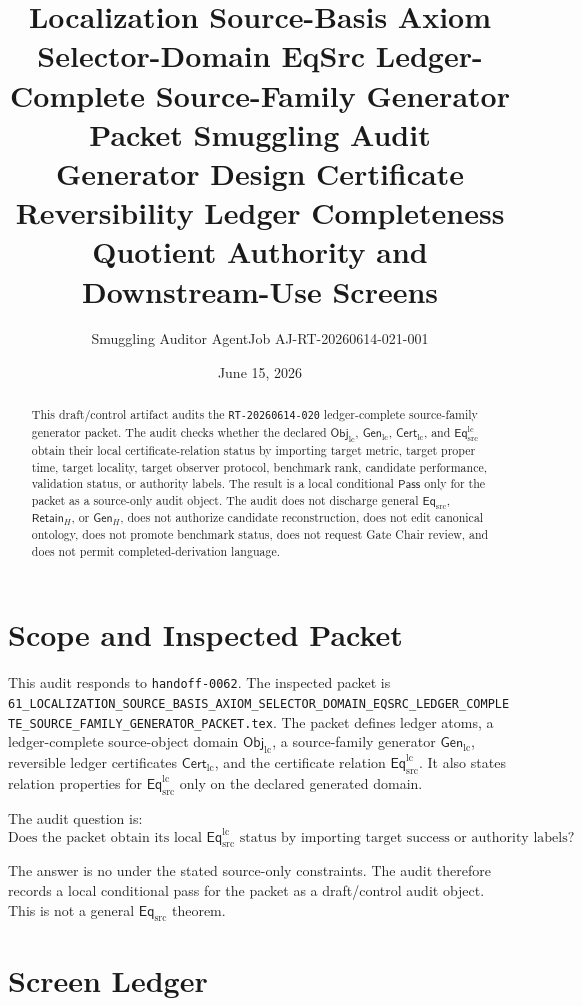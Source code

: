 \documentclass[11pt]{article}
\title{\textbf{Localization Source-Basis Axiom Selector-Domain EqSrc Ledger-Complete Source-Family Generator Packet Smuggling Audit}\\[0.35em]
\large Generator Design Certificate Reversibility Ledger Completeness Quotient Authority and Downstream-Use Screens}
\author{Smuggling Auditor AgentJob AJ-RT-20260614-021-001}
\date{June 15, 2026}
\newcommand{\EqSrc}{\mathsf{Eq}_{\mathrm{src}}}
\newcommand{\EqLC}{\mathsf{Eq}_{\mathrm{src}}^{\mathrm{lc}}}
\newcommand{\ObjLC}{\mathsf{Obj}_{\mathrm{lc}}}
\newcommand{\GenLC}{\mathsf{Gen}_{\mathrm{lc}}}
\newcommand{\CertLC}{\mathsf{Cert}_{\mathrm{lc}}}
\newcommand{\RetainH}{\mathsf{Retain}_{H}}
\newcommand{\GenH}{\mathsf{Gen}_{H}}
\newcommand{\Pass}{\mathsf{Pass}}
\begin{document}
\maketitle

\begin{abstract}
This draft/control artifact audits the \texttt{RT-20260614-020}
ledger-complete source-family generator packet. The audit checks whether
the declared \(\ObjLC\), \(\GenLC\), \(\CertLC\), and \(\EqLC\) obtain
their local certificate-relation status by importing target metric,
target proper time, target locality, target observer protocol, benchmark
rank, candidate performance, validation status, or authority labels. The
result is a local conditional \(\Pass\) only for the packet as a
source-only audit object. The audit does not discharge general
\(\EqSrc\), \(\RetainH\), or \(\GenH\), does not authorize candidate
reconstruction, does not edit canonical ontology, does not promote
benchmark status, does not request Gate Chair review, and does not
permit completed-derivation language.
\end{abstract}

\section{Scope and Inspected Packet}

This audit responds to \texttt{handoff-0062}. The inspected packet is
\texttt{61\_LOCALIZATION\_SOURCE\_BASIS\_AXIOM\_SELECTOR\_DOMAIN\_EQSRC\_LEDGER\_COMPLETE\_SOURCE\_FAMILY\_GENERATOR\_PACKET.tex}.
The packet defines ledger atoms, a ledger-complete source-object domain
\(\ObjLC\), a source-family generator \(\GenLC\), reversible ledger
certificates \(\CertLC\), and the certificate relation \(\EqLC\). It
also states relation properties for \(\EqLC\) only on the declared
generated domain.

The audit question is:
\[
    \text{Does the packet obtain its local }\EqLC\text{ status by
    importing target success or authority labels?}
\]

The answer is no under the stated source-only constraints. The audit
therefore records a local conditional pass for the packet as a
draft/control audit object. This is not a general \(\EqSrc\) theorem.

\section{Screen Ledger}
\end{document}
